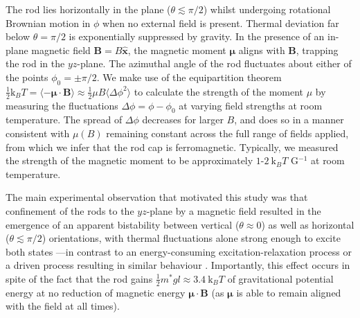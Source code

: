 \documentclass[aps,prl,reprint,twocolumn,superscriptaddress,showpacs]{revtex4-1}
\newcommand{\vcrm}[1]{\mathbf{#1}}
\newcommand{\hvcrm}[1]{\mathbf{\hat{#1}}}
\newcommand{\vc}[1]{\boldsymbol{#1}}
\newcommand{\kk}{\mathrm{k}_B}
\begin{document}
The rod lies horizontally in the plane ($\theta\lesssim\pi/2$) whilst undergoing rotational Brownian motion in $\phi$ when no external field is present. Thermal deviation far below $\theta=\pi/2$ is exponentially suppressed by gravity. In the presence of an in-plane magnetic field $\vcrm{B}=B \hvcrm{x}$, the magnetic moment $\vc{\mu}$ aligns with $\vcrm{B}$, trapping the rod in the $yz$-plane. The azimuthal angle of the rod fluctuates about either of the points $\phi_0=\pm\pi/2$. We make use of the equipartition theorem $ \frac{1}{2}\kk T = \langle -\vc{\mu}\cdot\vcrm{B}\rangle \approx \frac{1}{2}\mu B \langle \Delta\phi^2 \rangle $ to calculate the strength of the moment $\mu$ by measuring the fluctuations $\Delta\phi=\phi-\phi_0$ at varying field strengths at room temperature. The spread of $\Delta\phi$ decreases for larger $B$, and does so in a manner consistent with $\mu(B)$ remaining constant across the full range of fields applied, from which we infer that the rod cap is ferromagnetic. Typically, we measured the strength of the magnetic moment to be approximately $1$-$2\ \kk T $ G$^{-1}$ at room temperature.

The main experimental observation that motivated this study was that confinement of the rods to the $yz$-plane by a magnetic field resulted in the emergence of an apparent bistability between vertical ($\theta \approx 0$) as well as horizontal ($\theta \lesssim \pi/2$) orientations, with thermal fluctuations alone strong enough to excite both states ---in contrast to an energy-consuming excitation-relaxation process or a driven process resulting in similar behaviour \cite{Dhar2007}. Importantly, this effect occurs in spite of the fact that the rod gains $\frac{1}{2}m^* g l \approx 3.4 \ \kk T$ of gravitational potential energy at no reduction of magnetic energy $\vc{\mu}\cdot \vcrm{B}$ (as $\vc{\mu}$ is able to remain aligned with the field at all times).

\end{document}
